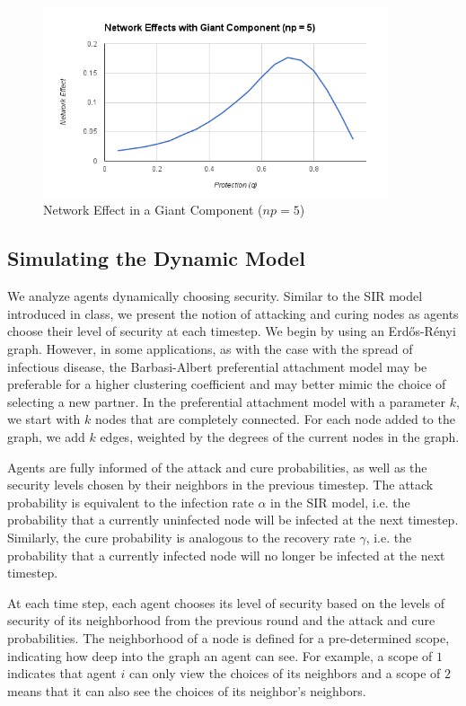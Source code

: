 \documentclass{article}
\theoremstyle{plain}
\begin{document}
\begin{figure}[h!]
  \centering
  \includegraphics[width=4in]{network_effects_np5.png}
  \caption{Network Effect in a Giant Component ($np = 5$)}
  \label{network_effects_np5.fig}
\end{figure}

\subsection{Simulating the Dynamic Model}

We analyze agents dynamically choosing security. Similar to the SIR model introduced in class, we present the notion of attacking and curing nodes as agents choose their level of security at each timestep. We begin by using an Erd\H{o}s-R\'{e}nyi graph. However, in some applications, as with the case with the spread of infectious disease, the Barbasi-Albert preferential attachment model may be preferable for a higher clustering coefficient and may better mimic the choice of selecting a new partner. In the preferential attachment model with a parameter $k$, we start with $k$ nodes that are completely connected. For each node added to the graph, we add $k$ edges, weighted by the degrees of the current nodes in the graph.

Agents are fully informed of the attack and cure probabilities, as well as the security levels chosen by their neighbors in the previous timestep. The attack probability is equivalent to the infection rate $\alpha$ in the SIR model, i.e. the probability that a currently uninfected node will be infected at the next timestep. Similarly, the cure probability is analogous to the recovery rate $\gamma$, i.e. the probability that a currently infected node will no longer be infected at the next timestep.

At each time step, each agent chooses its level of security based on the levels of security of its neighborhood from the previous round and the attack and cure probabilities. The neighborhood of a node is defined for a pre-determined scope, indicating how deep into the graph an agent can see. For example, a scope of $1$ indicates that  agent $i$ can only view the choices of its neighbors and a scope of $2$ means that it can also see the choices of its neighbor's neighbors.
\end{document}
